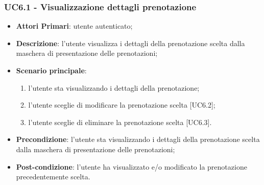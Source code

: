  \subsubsection{UC6.1 - Visualizzazione dettagli prenotazione}
\begin{itemize}
	\item \textbf{Attori Primari}: utente autenticato;
	\item \textbf{Descrizione}: l'utente visualizza i dettagli della prenotazione scelta dalla maschera di presentazione delle prenotazioni;
	\item \textbf{Scenario principale}:
	\begin{enumerate}[label=\alph*.]
		\item l'utente sta visualizzando i dettagli della prenotazione;
		\item l'utente sceglie di modificare la prenotazione scelta [UC6.2];
		\item l'utente sceglie di eliminare la prenotazione scelta [UC6.3].
	\end{enumerate}
	\item \textbf{Precondizione}: l'utente sta visualizzando i dettagli della prenotazione scelta dalla maschera di presentazione delle prenotazioni;
	\item \textbf{Post-condizione}: l'utente ha visualizzato e/o modificato la prenotazione precedentemente scelta.
\end{itemize}

